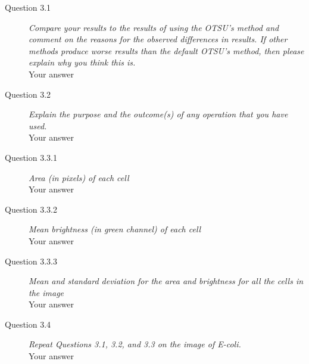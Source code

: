 \documentclass[a4paper, oneside]{article}
\begin{document}
	\begin{description}	
    \item[Question 3.1 ] \emph{Compare your results to the results of using the OTSU's method and
comment on the reasons for the observed differences in results. If other methods produce worse results than the default OTSU's method, then please explain why you think this is.} \\ Your answer
    \item[Question 3.2 ] \emph{Explain the purpose
and the outcome(s) of any operation that you have used.} \\ Your answer
    
    \item[Question 3.3.1] \emph{Area (in pixels) of each cell}
    \\ Your answer
    \item[Question 3.3.2] \emph{Mean brightness (in green channel) of each cell}
    \\ Your answer
    \item[Question 3.3.3] \emph{Mean and standard deviation for the area and brightness for all the cells in the image}    
    \\ Your answer
    
    \item[Question 3.4] \emph{Repeat Questions 3.1, 3.2, and 3.3 on the image of E-coli.}
    \\ Your answer
    
	\end{description}
	
\end{document}
